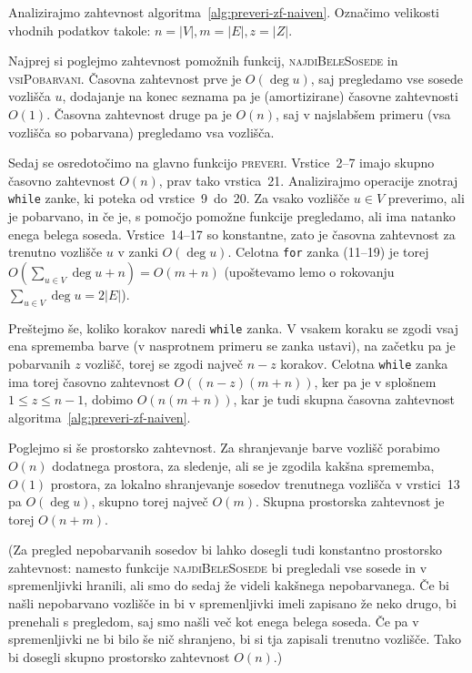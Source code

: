 \documentclass[12pt,a4paper,twoside]{article}
\theoremstyle{definition} %
\theoremstyle{plain} %
\numberwithin{equation}{section}  %
\begin{document}
Analizirajmo zahtevnost algoritma~\ref{alg:preveri-zf-naiven}. Označimo velikosti vhodnih podatkov takole: $n = |V|, m = |E|, z = |Z|$. 

Najprej si poglejmo zahtevnost pomožnih funkcij, \textsc{najdiBeleSosede} in \textsc{vsiPobarvani}.
Časovna zahtevnost prve je $O(\deg u)$, saj pregledamo vse sosede vozlišča $u$, dodajanje na konec seznama pa je (amortizirane) časovne zahtevnosti $O(1)$. Časovna zahtevnost druge pa je $O(n)$, saj v najslabšem primeru (vsa vozlišča so pobarvana) pregledamo vsa vozlišča.

Sedaj se osredotočimo na glavno funkcijo \textsc{preveri}. Vrstice~2--7 imajo skupno časovno zahtevnost $O(n)$, prav tako vrstica~21. Analizirajmo operacije znotraj \texttt{while} zanke, ki poteka od vrstice~9~do~20. Za vsako vozlišče $u \in V$ preverimo, ali je pobarvano, in če je, s pomočjo pomožne funkcije pregledamo, ali ima natanko enega belega soseda. Vrstice~14--17 so konstantne, zato je časovna zahtevnost za trenutno vozlišče $u$ v zanki $O(\deg u)$. Celotna \texttt{for} zanka (11--19) je torej $O(\sum_{u \in V} \deg u + n) = O(m + n)$ (upoštevamo lemo o rokovanju $\sum_{u \in V} \deg u = 2 |E|$). 

Preštejmo še, koliko korakov naredi \texttt{while} zanka. V vsakem koraku se zgodi vsaj ena sprememba barve (v nasprotnem primeru se zanka ustavi), na začetku pa je pobarvanih $z$ vozlišč, torej se zgodi največ $n - z$ korakov. Celotna \texttt{while} zanka ima torej časovno zahtevnost $O((n-z) (m+n))$, ker pa je v splošnem $1 \leq z \leq n-1$, dobimo $O(n(m+n))$, kar je tudi skupna časovna zahtevnost algoritma~\ref{alg:preveri-zf-naiven}.

Poglejmo si še prostorsko zahtevnost. Za shranjevanje barve vozlišč porabimo $O(n)$ dodatnega prostora, za sledenje, ali se je zgodila kakšna sprememba, $O(1)$ prostora, za lokalno shranjevanje sosedov trenutnega vozlišča v vrstici~13 pa $O(\deg u)$, skupno torej največ $O(m)$. Skupna prostorska zahtevnost je torej $O(n + m)$.

(Za pregled nepobarvanih sosedov bi lahko dosegli tudi konstantno prostorsko zahtevnost: namesto funkcije \textsc{najdiBeleSosede} bi pregledali vse sosede in v spremenljivki hranili, ali smo do sedaj že videli kakšnega nepobarvanega. Če bi našli nepobarvano vozlišče in bi v spremenljivki imeli zapisano že neko drugo, bi prenehali s pregledom, saj smo našli več kot enega belega soseda. Če pa v spremenljivki ne bi bilo še nič shranjeno, bi si tja zapisali trenutno vozlišče. Tako bi dosegli skupno prostorsko zahtevnost $O(n)$.)
\end{document}
